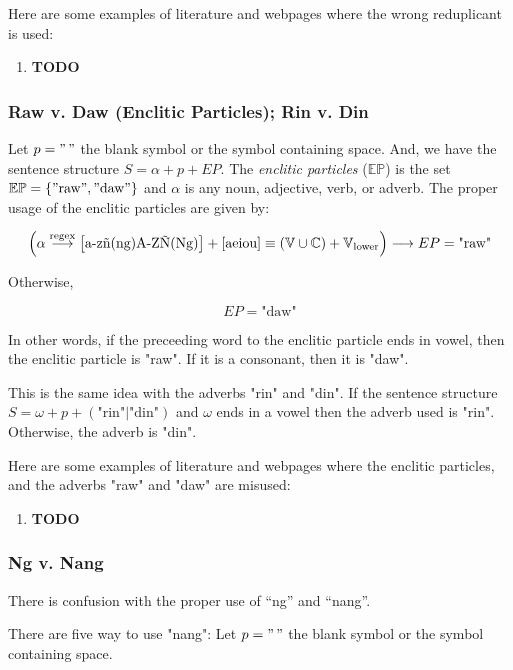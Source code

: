\begin{example}
    Here are some examples of literature and webpages where the wrong reduplicant is
    used:
\end{example}
\begin{enumerate}
    \item \textbf{TODO}
\end{enumerate}

\subsubsection{Raw v. Daw (Enclitic Particles); Rin v. Din}

Let \(p = "\,"\) the blank symbol or the symbol containing space. And, we have the
sentence structure \(S = \alpha + p + EP\). The \textit{enclitic particles}
(\(\mathbb{EP}\)) is the set \(\mathbb{EP} = \{"\text{raw}", "\text{daw}"\}\) and
\(\alpha\) is any noun, adjective, verb, or adverb. The proper usage of the enclitic
particles are given by:

\[
    \left(\alpha \overset{\text{regex}}{\longrightarrow} \left[\text{a-zñ(ng)A-ZÑ(Ng)}\right]+\left[\text{aeiou}\right] \equiv (\mathbb{V}\cup\mathbb{C}) + \mathbb{V}_\text{lower}\right)
    \longrightarrow EP = \text{"raw"}
\]

Otherwise,

\[
    EP = \text{"daw"}
\]

In other words, if the preceeding word to the enclitic particle ends in vowel,
then the enclitic particle is "raw". If it is a consonant, then it is "daw".

This is the same idea with the adverbs "rin" and "din". If the sentence structure
\(S = \omega + p + (\text{"rin"}|\text{"din"})\) and \(\omega\) ends in a vowel
then the adverb used is "rin". Otherwise, the adverb is "din".

Here are some examples of literature and webpages where the enclitic particles,
and the adverbs "raw" and "daw" are misused:
\begin{enumerate}
    \item \textbf{TODO}
\end{enumerate}

\subsubsection{Ng v. Nang}

There is confusion with the proper use of “ng” and “nang”.

There are five way to use "nang":
Let \(p = "\,"\) the blank symbol or the symbol containing space.

